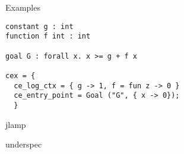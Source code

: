 \documentclass[a4paper,twoside]{article}
\begin{document}
Examples

\begin{lstlisting}
constant g : int
function f int : int

goal G : forall x. x >= g + f x

cex = {
  ce_log_ctx = { g -> 1, f = fun z -> 0 }
  ce_entry_point = Goal ("G", { x -> 0});
  }
\end{lstlisting}

jlamp

underspec



%

\end{document}
